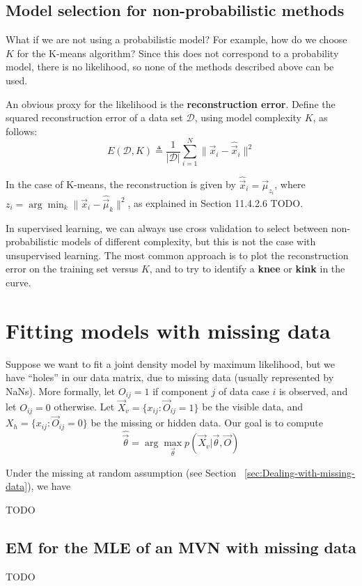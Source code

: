 \subsection{Model selection for non-probabilistic methods}
What if we are not using a probabilistic model? For example, how do we choose $K$ for the K-means algorithm? Since this does not correspond to a probability model, there is no likelihood, so none of the methods described above can be used.

An obvious proxy for the likelihood is the \textbf{reconstruction error}. Define the squared reconstruction error of a data set $\mathcal{D}$, using model complexity $K$, as follows:
\begin{equation}
E(\mathcal{D}, K) \triangleq \frac{1}{|\mathcal{D}|}\sum\limits_{i=1}^N \lVert\vec{x}_i-\hat{\vec{x}}_i\rVert^2
\end{equation}

In the case of K-means, the reconstruction is given by $\hat{\vec{x}}_i=\vec{\mu}_{z_i}$, where $z_i=\arg\min_k \lVert\vec{x}_i-\hat{\vec{\mu}}_k\rVert^2$, as explained in Section 11.4.2.6 TODO.

In supervised learning, we can always use cross validation to select between non-probabilistic models of different complexity, but this is not the case with unsupervised learning. The most common approach is to plot the reconstruction error on the training set versus $K$, and to try to identify a \textbf{knee} or \textbf{kink} in the curve. 


\section{Fitting models with missing data}
Suppose we want to fit a joint density model by maximum likelihood, but we have “holes” in our data matrix, due to missing data (usually represented by NaNs). More formally, let $O_{ij} =1$ if component $j$ of data case $i$ is observed, and let $O_{ij} =0$ otherwise. Let $\vec{X}_v=\{x_{ij}: \vec{O}_{ij} =1\}$ be the visible data, and $X_h=\{x_{ij}: \vec{O}_{ij} =0\}$ be the missing or hidden data. Our goal is to compute
\begin{equation}
\hat{\vec{\theta}}=\arg\max_{\vec{\theta}} p(\vec{X}_v|\vec{\theta}, \vec{O})
\end{equation}

Under the missing at random assumption (see Section ~\ref{sec:Dealing-with-missing-data}), we have

TODO

\subsection{EM for the MLE of an MVN with missing data}
TODO
